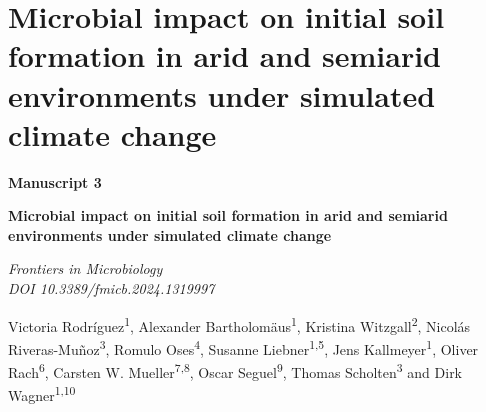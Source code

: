 \chapter{Microbial impact on initial soil formation in arid and semiarid environments under simulated climate change}

\label{chap:manuscript3} %

\begin{center}
  \textbf{\Large Manuscript 3}
\end{center} 
\vspace{0.1cm}
\begin{center}
  \textbf{\huge Microbial impact on initial soil formation in arid and semiarid environments under simulated climate change}
\end{center} 
\vspace{0.2cm}
\begin{center}
    \textit{Frontiers in Microbiology}\\
    \textit{DOI 10.3389/fmicb.2024.1319997}
\end{center}
    
\vspace{0.5cm}
  
\begin{justify}
  Victoria Rodríguez\textsuperscript{1}, Alexander Bartholomäus\textsuperscript{1}, Kristina Witzgall\textsuperscript{2}, Nicolás Riveras-Muñoz\textsuperscript{3}, Romulo Oses\textsuperscript{4}, Susanne Liebner\textsuperscript{1,5}, Jens Kallmeyer\textsuperscript{1}, Oliver Rach\textsuperscript{6}, Carsten W. Mueller\textsuperscript{7,8}, Oscar Seguel\textsuperscript{9}, Thomas Scholten\textsuperscript{3} and Dirk Wagner\textsuperscript{1,10}
\end{justify}
  
\vspace{0.2cm}
  
